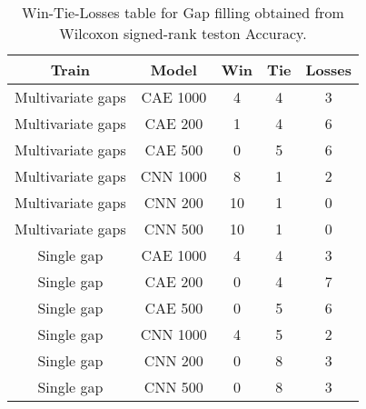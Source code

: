 \begin{table}[H]
\centering
\begin{tabular}{|c|c|c|c|c|}

    \textbf{Train} & \textbf{Model} &  \textbf{Win} &  \textbf{Tie} &  \textbf{Losses} \\
\hline

 Multivariate gaps &       CAE 1000 &             4 &             4 &                3 \\
\hline
 Multivariate gaps &        CAE 200 &             1 &             4 &                6 \\
\hline
 Multivariate gaps &        CAE 500 &             0 &             5 &                6 \\
\hline
 Multivariate gaps &       CNN 1000 &             8 &             1 &                2 \\
\hline
 Multivariate gaps &        CNN 200 &            10 &             1 &                0 \\
\hline
 Multivariate gaps &        CNN 500 &            10 &             1 &                0 \\
\hline
        Single gap &       CAE 1000 &             4 &             4 &                3 \\
\hline
        Single gap &        CAE 200 &             0 &             4 &                7 \\
\hline
        Single gap &        CAE 500 &             0 &             5 &                6 \\
\hline
        Single gap &       CNN 1000 &             4 &             5 &                2 \\
\hline
        Single gap &        CNN 200 &             0 &             8 &                3 \\
\hline
        Single gap &        CNN 500 &             0 &             8 &                3 \\
\hline

\end{tabular}
\caption{Win-Tie-Losses table for Gap filling obtained from Wilcoxon signed-rank teston Accuracy.}
\label{tab:gap_filling_model_training_data_comparison}
\end{table}